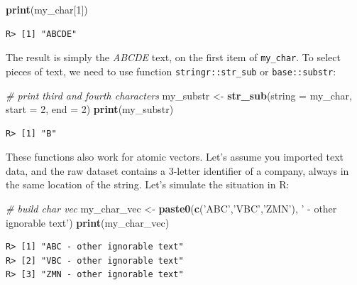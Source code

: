 \documentclass[
  12pt,
]{book}
\newenvironment{Shaded}{\begin{snugshade}}{\end{snugshade}}
\newcommand{\CommentTok}[1]{\textcolor[rgb]{0.37,0.37,0.37}{\textit{#1}}}
\newcommand{\DataTypeTok}[1]{\textcolor[rgb]{0.27,0.27,0.27}{#1}}
\newcommand{\DecValTok}[1]{\textcolor[rgb]{0.06,0.06,0.06}{#1}}
\newcommand{\KeywordTok}[1]{\textcolor[rgb]{0.27,0.27,0.27}{\textbf{#1}}}
\newcommand{\NormalTok}[1]{#1}
\newcommand{\StringTok}[1]{\textcolor[rgb]{0.5,0.5,0.5}{#1}}
\begin{document}
\begin{Shaded}
\begin{Highlighting}[]
\KeywordTok{print}\NormalTok{(my_char[}\DecValTok{1}\NormalTok{])}
\end{Highlighting}
\end{Shaded}

\begin{verbatim}
R> [1] "ABCDE"
\end{verbatim}

The result is simply the \emph{ABCDE} text, on the first item of \texttt{my\_char}. To select pieces of text, we need to use function \texttt{stringr::str\_sub} or \texttt{base::substr}:  

\begin{Shaded}
\begin{Highlighting}[]
\CommentTok{# print third and fourth characters}
\NormalTok{my_substr <-}\StringTok{ }\KeywordTok{str_sub}\NormalTok{(}\DataTypeTok{string =}\NormalTok{ my_char,}
                     \DataTypeTok{start =} \DecValTok{2}\NormalTok{,}
                     \DataTypeTok{end =} \DecValTok{2}\NormalTok{)}
\KeywordTok{print}\NormalTok{(my_substr)}
\end{Highlighting}
\end{Shaded}

\begin{verbatim}
R> [1] "B"
\end{verbatim}

These functions also work for atomic vectors. Let's assume you imported text data, and the raw dataset contains a 3-letter identifier of a company, always in the same location of the string. Let's simulate the situation in R:

\begin{Shaded}
\begin{Highlighting}[]
\CommentTok{# build char vec}
\NormalTok{my_char_vec <-}\StringTok{ }\KeywordTok{paste0}\NormalTok{(}\KeywordTok{c}\NormalTok{(}\StringTok{'ABC'}\NormalTok{,}\StringTok{'VBC'}\NormalTok{,}\StringTok{'ZMN'}\NormalTok{),}
                      \StringTok{' - other ignorable text'}\NormalTok{)}
\KeywordTok{print}\NormalTok{(my_char_vec)}
\end{Highlighting}
\end{Shaded}

\begin{verbatim}
R> [1] "ABC - other ignorable text"
R> [2] "VBC - other ignorable text"
R> [3] "ZMN - other ignorable text"
\end{verbatim}
\end{document}
